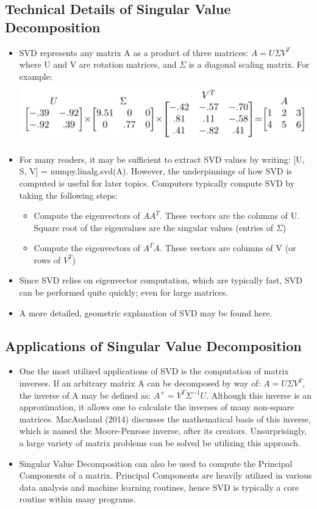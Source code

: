 \documentclass{article}
\begin{document}
\subsection{Technical Details of Singular Value Decomposition}
\begin{itemize}
\item SVD represents any matrix	A as a product of three	matrices: $A = U\Sigma V^T$ where U and V are rotation matrices, and $\Sigma$ is a diagonal scaling matrix.	For example:\\
\includegraphics[scale = 0.5]{usigv_example}
\item For many readers, it may be sufficient to extract SVD values by writing: [U, S, V] = numpy.linalg.svd(A). However, the underpinnings of how SVD is computed is useful for later topics. Computers typically compute SVD by taking the following steps:
	\begin{itemize}
    	\item Compute the eigenvectors of $AA^{T}$. These vectors are the columns of U. Square root of the eigenvalues are the singular values (entries of $\Sigma$)
        \item Compute the eigenvectors of $A^{T}A$. These vectors are columns of V (or rows of $V^{T}$)
    \end{itemize}
\item Since SVD relies on eigenvector computation, which are typically fast, SVD can be performed quite quickly; even for large matrices.
\item A more detailed, geometric explanation of SVD may be found here\cite{ams}.
\end{itemize}

\subsection{Applications of Singular Value Decomposition}
\begin{itemize}
\item One the most utilized applications of SVD is the computation of matrix inverses. If an arbitrary matrix A can be decomposed by way of: $A = U\Sigma V^T$, the inverse of A may be defined as: $A^{+} = V^T \Sigma^{-1}U$. Although this inverse is an approximation, it allows one to calculate the inverses of many non-square matrices. MacAusland (2014) discusses the mathematical basis of this inverse, which is named the Moore-Penrose inverse, after its creators\cite{moore-penrose}. Unsurprisingly, a large variety of matrix problems can be solved be utilizing this approach. 
\item Singular Value Decomposition can also be used to compute the Principal Components of a matrix. Principal Components are heavily utilized in various data analysis and machine learning routines, hence SVD is typically a core routine within many programs.
\end{itemize}
\end{document}

